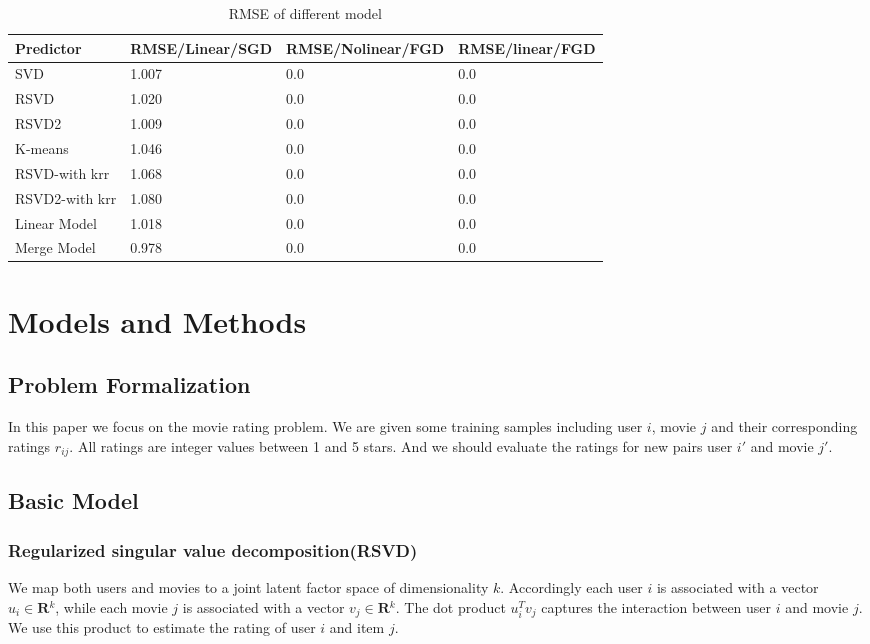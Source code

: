 \documentclass[10pt,conference,compsocconf]{IEEEtran}
\begin{document}
\begin{table*}[htbp]
  \centering
  \begin{tabular}[c]{|l||l|l|l|}
    \hline
    Predictor&RMSE/Linear/SGD&RMSE/Nolinear/FGD&RMSE/linear/FGD\\
    \hline
    SVD&1.007&0.0&0.0\\
    RSVD&1.020&0.0&0.0\\
    RSVD2&1.009&0.0&0.0\\
    K-means&1.046&0.0&0.0\\
    RSVD-with krr&1.068&0.0&0.0\\
    RSVD2-with krr&1.080&0.0&0.0\\
    Linear Model&1.018&0.0&0.0\\
    Merge Model&0.978&0.0&0.0\\
    \hline
  \end{tabular}
    \caption{  \label{mytable} RMSE of different model}
\end{table*}

\section{Models and Methods}
\subsection{Problem Formalization}
In this paper we focus on the movie rating problem. We are given some training samples including user $i$, movie $j$ and their corresponding ratings $r_{ij}$. All ratings are integer values between 1 and 5 stars. And we should evaluate the ratings for new pairs user $i'$ and movie $j'$.

\subsection{Basic Model}
\subsubsection{Regularized singular value decomposition(RSVD)}
We map both users and movies to a joint latent factor space of dimensionality $k$. Accordingly each user $i$ is associated with a vector $u_{i} \in \textbf{R$^k$}$, while each movie $j$ is associated with a vector $v_{j} \in \textbf{R$^k$} $. The dot product $u_i^Tv_j$ captures the interaction between user $i$ and movie $j$. We use this product to estimate the rating of user $i$ and item $j$.
\end{document}
